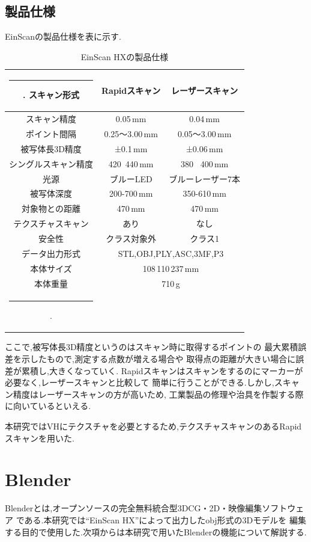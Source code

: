 \documentclass{ltjsreport}
\makeatletter
\def\Hline{
  \noalign{\ifnum0=`}\fi\hrule \@height 3.\arrayrulewidth \futurelet
  \reserved@a\@xhline}
\makeatother
\begin{document}
		\subsection{製品仕様}
			EinScanの製品仕様を表に示す.
			\begin{table}[H]
			\begin{center}
			\caption{EinScan HXの製品仕様}
			\label{tab:EinScan}
			\begin{tabular}{c|cc} \Hline
				スキャン形式&Rapidスキャン&レーザースキャン\\ \hline
				スキャン精度&0.05\,mm&0.04\,mm\\
				ポイント間隔&0.25～3.00\,mm&0.05～3.00\,mm\\
				被写体長3D精度&±0.1\,mm&±0.06\,mm\\
				シングルスキャン精度&420 \times \,440\,mm&380 \times\, 400\,mm\\
				光源&ブルーLED&ブルーレーザー7本\\
				被写体深度&200-700\,mm&350-610\,mm\\
				対象物との距離&470\,mm&470\,mm\\
				テクスチャスキャン&あり&なし\\
				安全性&クラス対象外&クラス1\\ \hline
				データ出力形式&\multicolumn{2}{c}{STL,OBJ,PLY,ASC,3MF,P3}\\
				本体サイズ&\multicolumn{2}{c}{108\times\,110\times\,237\,mm}\\
				本体重量&\multicolumn{2}{c}{710\,g}\\ \Hline
			\end{tabular}
			\end{center}
			\hspace{-32truemm}
			\end{table}
			ここで,被写体長3D精度というのはスキャン時に取得するポイントの
			最大累積誤差を示したもので,測定する点数が増える場合や
			取得点の距離が大きい場合に誤差が累積し,大きくなっていく.
			Rapidスキャンはスキャンをするのにマーカーが必要なく,レーザースキャンと比較して
			簡単に行うことができる.しかし,スキャン精度はレーザースキャンの方が高いため,
			工業製品の修理や治具を作製する際に向いているといえる.

			本研究ではVHにテクスチャを必要とするため,テクスチャスキャンのあるRapidスキャンを用いた.
	\section{Blender}
		Blenderとは,オープンソースの完全無料統合型3DCG・2D・映像編集ソフトウェア
		である.本研究では``EinScan HX''によって出力したobj形式の3Dモデルを
		編集する目的で使用した.次項からは本研究で用いたBlenderの機能について解説する.
\end{document}
